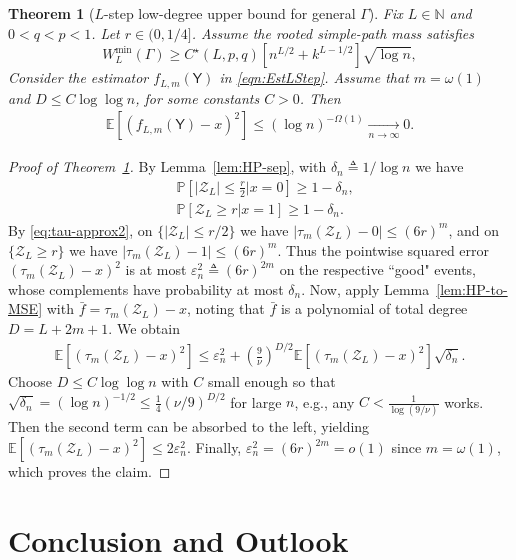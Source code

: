 \documentclass[12pt]{article}
\newcommand{\bE}{\mathbb{E}}
\newtheorem{theorem}{Theorem}
\newcommand {\pr} {\mathbb{P}}
\newcommand{\p}[1]{\left(#1\right)}
\newcommand{\pp}[1]{\left[#1\right]}
\newcommand{\s}[1]{\mathsf{#1}}
\begin{document}
\begin{theorem}[$L$-step low-degree upper bound for general $\Gamma$]\label{thm:LD-upper-ell}
Fix $L\in\mathbb{N}$ and $0<q<p<1$. Let $r\in(0,1/4]$.
Assume the rooted simple-path mass satisfies
\begin{equation}
W_L^{\min}(\Gamma)\geq C^\star(L,p,q)\pp{n^{L/2}+k^{L-1/2}}\sqrt{\log n},
\end{equation}
Consider the estimator $f_{L,m}(\s{Y})$ in \eqref{eqn:EstLStep}. Assume that $m=\omega(1)$ and $D\le C\log\log n$, for some constants $C>0$. Then
\begin{align}
\bE\pp{(f_{L,m}(\s{Y})-x)^2}\leq (\log n)^{-\Omega(1)} \xrightarrow[n\to\infty]{}0.
\end{align}
\end{theorem}

\begin{proof}[Proof of Theorem~\ref{thm:LD-upper-ell}]
By Lemma~\ref{lem:HP-sep}, with $\delta_n\triangleq 1/\log n$ we have
\begin{align}
&\pr\pp{|\mathscr{Z}_L|\leq \tfrac{r}{2}\vert x=0}\ge1-\delta_n,\\
&\pr\pp{\mathscr{Z}_L\geq r\vert x=1}\geq1-\delta_n.
\end{align}
By \eqref{eq:tau-approx2}, on $\{|\mathscr{Z}_L|\le r/2\}$ we have $|\tau_m(\mathscr{Z}_L)-0|\le (6r)^m$, and on $\{\mathscr{Z}_L\ge r\}$ we have $|\tau_m(\mathscr{Z}_L)-1|\le (6r)^m$.
Thus the pointwise squared error $(\tau_m(\mathscr{Z}_L)-x)^2$ is at most $\varepsilon_n^2\triangleq (6r)^{2m}$ on the respective ``good" events, whose complements have probability at most $\delta_n$.
Now, apply Lemma~\ref{lem:HP-to-MSE} with $\bar{f}=\tau_m(\mathscr{Z}_L)-x$, noting that $\bar{f}$ is a polynomial of total degree $D=L+2m+1$. We obtain
\begin{align}
\bE[(\tau_m(\mathscr{Z}_L)-x)^2]\leq\varepsilon_n^2+\p{\frac{9}{\nu}}^{D/2}\bE[(\tau_m(\mathscr{Z}_L)-x)^2]\sqrt{\delta_n}.
\end{align}
Choose $D\le C\log\log n$ with $C$ small enough so that $\sqrt{\delta_n}=(\log n)^{-1/2}\le \tfrac14(\nu/9)^{D/2}$ for large $n$, e.g., any $C<\frac{1}{\log(9/\nu)}$ works. Then the second term can be absorbed to the left, yielding $\bE[(\tau_m(\mathscr{Z}_L)-x)^2]\leq 2\varepsilon_n^2$. Finally, $\varepsilon_n^2=(6r)^{2m}=o(1)$ since $m=\omega(1)$, which proves the claim.
\end{proof}


\section{Conclusion and Outlook}\label{sec:Out}
\end{document}

